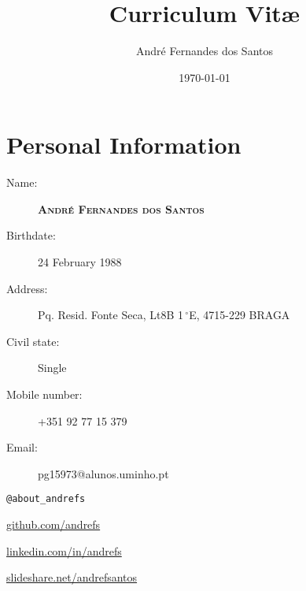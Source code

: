 \documentclass{article}
\author{André Fernandes dos Santos}
\title{Curriculum Vit\ae}
\date{\today}
\begin{document}
\maketitle

\section{Personal Information}
\begin{multicols}{2}
	\begin{description}
	\item [Name:] \textbf{\textsc{André Fernandes dos Santos}}
	\item [Birthdate:] 24 February 1988
	\item [Address:] Pq. Resid. Fonte Seca, Lt8B 1$\,^{\circ}$E, 4715-229 BRAGA
	\item [Civil state:] Single
	\item [Mobile number:] +351 92 77 15 379
	\item [Email:] pg15973@alunos.uminho.pt
	\end{description}

	\columnbreak

	\vspace{.2cm}
	\begin{description}
		\small
		\item [Twitter:] \texttt{@about\_andrefs} 
		\item [GitHub:] \url{github.com/andrefs} 
		\item [LinkedIn:] \url{linkedin.com/in/andrefs}
		\item [SlideShare:] \url{slideshare.net/andrefsantos}
	\end{description}
\end{multicols}
\end{document}
